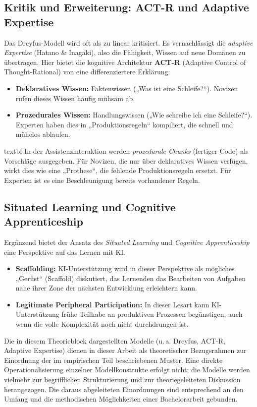 \subsection{Kritik und Erweiterung: ACT-R und Adaptive Expertise}
Das Dreyfus-Modell wird oft als zu linear kritisiert. Es vernachlässigt die \emph{adaptive Expertise} (Hatano \& Inagaki), also die Fähigkeit, Wissen auf neue Domänen zu übertragen.
Hier bietet die kognitive Architektur  \textbf{ACT-R} (Adaptive Control of Thought-Rational) von \textcite{anderson1996act} eine differenziertere Erklärung:
\begin{itemize}
    \item  \textbf{Deklaratives Wissen:} Faktenwissen („Was ist eine Schleife?“). Novizen rufen dieses Wissen häufig mühsam ab.
    \item  \textbf{Prozedurales Wissen:} Handlungswissen („Wie schreibe ich eine Schleife?“). Experten haben dies in „Produktionsregeln“ kompiliert, die schnell und mühelos ablaufen.
\end{itemize}
        \csname textbf In der Assistenzinteraktion werden \emph{prozedurale Chunks} (fertiger Code) als Vorschläge ausgegeben.
    Für Novizen, die nur über deklaratives Wissen verfügen, wirkt dies wie eine „Prothese“, die fehlende Produktionsregeln ersetzt.
    Für Experten ist es eine Beschleunigung bereits vorhandener Regeln.

\subsection{Situated Learning und Cognitive Apprenticeship}
Ergänzend bietet der Ansatz des \emph{Situated Learning} \parencite{lave1991situated} und \emph{Cognitive Apprenticeship} \parencite{collins1989cognitive} eine Perspektive auf das Lernen mit KI.
\begin{itemize}
    \item  \textbf{Scaffolding:} KI-Unterstützung wird in dieser Perspektive als mögliches „Gerüst“ (Scaffold) diskutiert, das Lernenden das Bearbeiten von Aufgaben nahe ihrer Zone der nächsten Entwicklung erleichtern kann.
    \item  \textbf{Legitimate Peripheral Participation:} In dieser Lesart kann KI-Unterstützung frühe Teilhabe an produktiven Prozessen begünstigen, auch wenn die volle Komplexität noch nicht durchdrungen ist.
\end{itemize}

Die in diesem Theorieblock dargestellten Modelle (u.\,a. Dreyfus, ACT-R, Adaptive Expertise) dienen in dieser Arbeit als theoretischer Bezugsrahmen zur Einordnung der im empirischen Teil beschriebenen Muster. Eine direkte Operationalisierung einzelner Modellkonstrukte erfolgt nicht; die Modelle werden vielmehr zur begrifflichen Strukturierung und zur theoriegeleiteten Diskussion herangezogen. Die daraus abgeleiteten Einordnungen sind entsprechend an den Umfang und die methodischen Möglichkeiten einer Bachelorarbeit gebunden.

